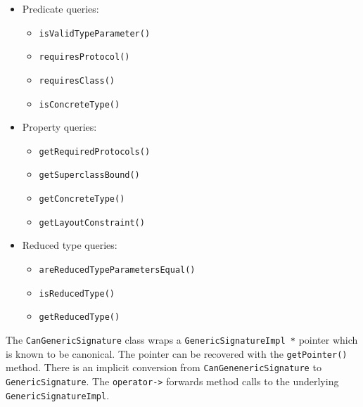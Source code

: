 \documentclass[../generics]{subfiles}
\begin{document}
\begin{itemize}
\item Predicate queries:
\begin{itemize}
\item \texttt{isValidTypeParameter()}
\item \texttt{requiresProtocol()}
\item \texttt{requiresClass()}
\item \texttt{isConcreteType()}
\end{itemize}
\item Property queries:
\begin{itemize}
\item \texttt{getRequiredProtocols()}
\item \texttt{getSuperclassBound()}
\item \texttt{getConcreteType()}
\item \texttt{getLayoutConstraint()}
\end{itemize}
\item Reduced type queries:
\begin{itemize}
\item \texttt{areReducedTypeParametersEqual()}
\item \texttt{isReducedType()}
\item \texttt{getReducedType()}
\end{itemize}
\end{itemize}

The \texttt{CanGenericSignature} class wraps a \texttt{GenericSignatureImpl *} pointer which is known to be canonical. The pointer can be recovered with the \texttt{getPointer()} method. There is an implicit conversion from \texttt{CanGenenericSignature} to \texttt{GenericSignature}. The \texttt{operator->} forwards method calls to the underlying \texttt{GenericSignatureImpl}.
\end{document}

